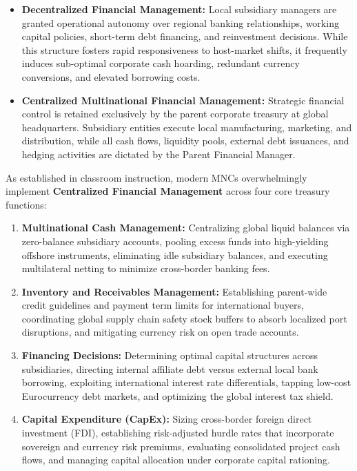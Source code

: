 \begin{itemize}[leftmargin=1.5em]
    \item \textbf{Decentralized Financial Management:} Local subsidiary managers are granted operational autonomy over regional banking relationships, working capital policies, short-term debt financing, and reinvestment decisions. While this structure fosters rapid responsiveness to host-market shifts, it frequently induces sub-optimal corporate cash hoarding, redundant currency conversions, and elevated borrowing costs.
    \item \textbf{Centralized Multinational Financial Management:} Strategic financial control is retained exclusively by the parent corporate treasury at global headquarters. Subsidiary entities execute local manufacturing, marketing, and distribution, while all cash flows, liquidity pools, external debt issuances, and hedging activities are dictated by the Parent Financial Manager.
\end{itemize}

\vspace{0.3em}

\noindent As established in classroom instruction, modern MNCs overwhelmingly implement \textbf{Centralized Financial Management} across four core treasury functions:

\begin{enumerate}[leftmargin=1.8em, label=\textbf{\arabic*.}]
    \item \textbf{Multinational Cash Management:} Centralizing global liquid balances via zero-balance subsidiary accounts, pooling excess funds into high-yielding offshore instruments, eliminating idle subsidiary balances, and executing multilateral netting to minimize cross-border banking fees.
    \item \textbf{Inventory and Receivables Management:} Establishing parent-wide credit guidelines and payment term limits for international buyers, coordinating global supply chain safety stock buffers to absorb localized port disruptions, and mitigating currency risk on open trade accounts.
    \item \textbf{Financing Decisions:} Determining optimal capital structures across subsidiaries, directing internal affiliate debt versus external local bank borrowing, exploiting international interest rate differentials, tapping low-cost Eurocurrency debt markets, and optimizing the global interest tax shield.
    \item \textbf{Capital Expenditure (CapEx):} Sizing cross-border foreign direct investment (FDI), establishing risk-adjusted hurdle rates that incorporate sovereign and currency risk premiums, evaluating consolidated project cash flows, and managing capital allocation under corporate capital rationing.
\end{enumerate}

